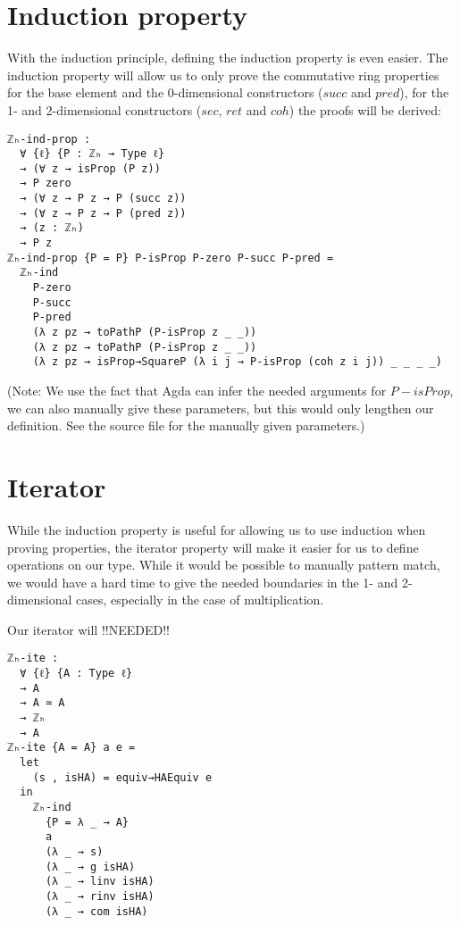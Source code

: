 \section{Induction property}

With the induction principle, defining the induction property is even easier. The induction property will allow us to only prove the commutative ring properties for the base element and the 0-dimensional constructors ($succ$ and $pred$), for the 1- and 2-dimensional constructors ($sec$, $ret$ and $coh$) the proofs will be derived:
\begin{verbatim}
ℤₕ-ind-prop :
  ∀ {ℓ} {P : ℤₕ → Type ℓ}
  → (∀ z → isProp (P z))
  → P zero
  → (∀ z → P z → P (succ z))
  → (∀ z → P z → P (pred z))
  → (z : ℤₕ)
  → P z
ℤₕ-ind-prop {P = P} P-isProp P-zero P-succ P-pred =
  ℤₕ-ind
    P-zero
    P-succ
    P-pred
    (λ z pz → toPathP (P-isProp z _ _))
    (λ z pz → toPathP (P-isProp z _ _))
    (λ z pz → isProp→SquareP (λ i j → P-isProp (coh z i j)) _ _ _ _)
\end{verbatim}
(Note: We use the fact that Agda can infer the needed arguments for $P-isProp$, we can also manually give these parameters, but this would only lengthen our definition. See the source file for the manually given parameters.)

\section{Iterator}
While the induction property is useful for allowing us to use induction when proving properties, the iterator property will make it easier for us to define operations on our type. While it would be possible to manually pattern match, we would have a hard time to give the needed boundaries in the 1- and 2-dimensional cases, especially in the case of multiplication.

Our iterator will !!NEEDED!!
\begin{verbatim}
ℤₕ-ite :
  ∀ {ℓ} {A : Type ℓ}
  → A
  → A ≃ A
  → ℤₕ
  → A
ℤₕ-ite {A = A} a e =
  let
    (s , isHA) = equiv→HAEquiv e
  in
    ℤₕ-ind
      {P = λ _ → A}
      a
      (λ _ → s)
      (λ _ → g isHA)
      (λ _ → linv isHA)
      (λ _ → rinv isHA)
      (λ _ → com isHA)
\end{verbatim}


